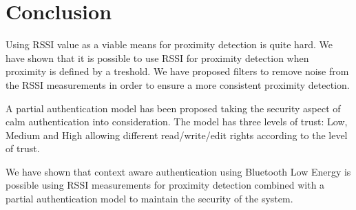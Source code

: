 \section{Conclusion}
Using RSSI value as a viable means for proximity detection is quite hard. We have shown that it is possible to use RSSI for proximity detection when proximity is defined by a treshold. We have proposed filters to remove noise from the RSSI measurements in order to ensure a more consistent proximity detection.

A partial authentication model has been proposed taking the security aspect of calm authentication into consideration. The model has three levels of trust: Low, Medium and High allowing different read/write/edit rights according to the level of trust.

We have shown that context aware authentication using Bluetooth Low Energy is possible using RSSI measurements for proximity detection combined with a partial authentication model to maintain the security of the system.
